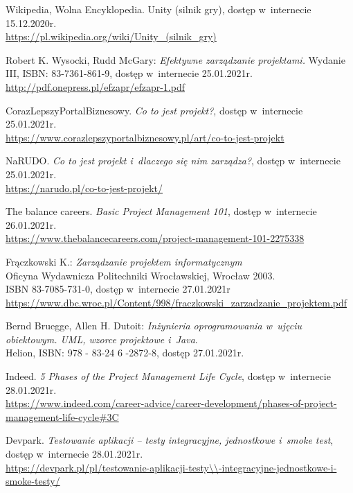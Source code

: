 \documentclass[oneside,polski,logo]{amuthesis}
\begin{document}
\begin{thebibliography}{100} 

\addtolength{\leftmargin}{0.2in} 
\setlength{\itemindent}{-0.2in}

Wikipedia, Wolna Encyklopedia. Unity (silnik gry), dostęp w~internecie 15.12.2020r.\\
\url{https://pl.wikipedia.org/wiki/Unity\_(silnik\_gry)}

Robert K. Wysocki, Rudd McGary: \emph{Efektywne zarządzanie projektami.} Wydanie III, ISBN: 83-7361-861-9, dostęp w~internecie 25.01.2021r.\\
\url{http://pdf.onepress.pl/efzapr/efzapr-1.pdf}

CorazLepszyPortalBiznesowy. \emph{Co to jest projekt?}, dostęp w~internecie 25.01.2021r.\\
\url{https://www.corazlepszyportalbiznesowy.pl/art/co-to-jest-projekt}

NaRUDO. \emph{Co to jest projekt i~dlaczego się nim zarządza?}, dostęp w~internecie 25.01.2021r.\\
\url{https://narudo.pl/co-to-jest-projekt/}

The balance careers. \emph{Basic Project Management 101}, dostęp w~internecie 26.01.2021r.\\
\url{https://www.thebalancecareers.com/project-management-101-2275338}

Frączkowski K.: \emph{Zarządzanie projektem informatycznym}\\
Oficyna Wydawnicza Politechniki Wrocławskiej, Wrocław 2003.\\
ISBN 83-7085-731-0, dostęp w~internecie 27.01.2021r\\
\url{https://www.dbc.wroc.pl/Content/998/fraczkowski\_zarzadzanie\_projektem.pdf}

Bernd Bruegge, Allen H. Dutoit: \emph{Inżynieria oprogramowania w~ujęciu obiektowym. UML, wzorce projektowe i~Java}.\\
Helion, ISBN: 978 - 83-24 6 -2872-8, dostęp 27.01.2021r.

Indeed. \emph{5 Phases of the Project Management Life Cycle}, dostęp w~internecie 28.01.2021r.\\
\url{https://www.indeed.com/career-advice/career-development/phases-of-project-management-life-cycle\#3C}

Devpark. \emph{Testowanie aplikacji – testy integracyjne, jednostkowe i~smoke test}, dostęp w~internecie 28.01.2021r.\\
\url{https://devpark.pl/pl/testowanie-aplikacji-testy\\-integracyjne-jednostkowe-i-smoke-testy/}


\end{thebibliography}
\end{document}
